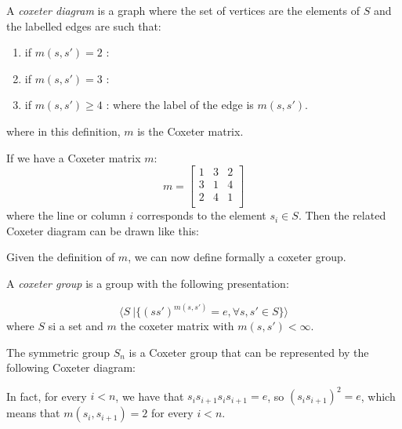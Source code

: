 \begin{definition}
  A \emph{coxeter diagram} is a graph where the set of vertices are the elements of $S$ and
  the labelled edges are such that:
  \begin{enumerate}
    \item if $m(s,s') = 2$ : \ 
    \item if $m(s,s') = 3$ :   
    \item if $m(s,s') \geq 4$ :  where the label of the edge is $m(s,s')$.
  \end{enumerate}
where in this definition, $m$ is the Coxeter matrix.
\end{definition}

\begin{example}
	If we have a Coxeter matrix $m$:
    \begin{equation}
      m =
    \begin{bmatrix}
    1 & 3 & 2\\
    3 & 1 & 4\\
    2 & 4 & 1\\
    \end{bmatrix}
    \end{equation}
where the line or column $i$ corresponds to the element $s_i \in S$. Then the related Coxeter diagram can be drawn like this:

\end{example}

Given the definition of $m$, we can now define formally a coxeter group.

\begin{definition}
A \emph{coxeter group} is a group with the following presentation:

\begin{equation}
  \langle S\  |\{  (ss')^{m(s,s')} = e, \forall s, s' \in S\} \rangle
\end{equation}
where $S$ si a set and $m$ the coxeter matrix with $m(s,s') < \infty$.

\end{definition}

\begin{example}
  The symmetric group $S_n$ is a Coxeter group that can be represented by the following Coxeter diagram:
  \begin{center}
  \end{center}
In fact, for every $i < n$, we have that $s_is_{i+1}s_is_{i+1} = e$, so $(s_is_{i+1})^2 = e$, which means that
  $m(s_i, s_{i+1}) = 2$ for every $i < n$.
\end{example}

